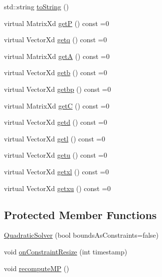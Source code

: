 {\bf }\par
\begin{DoxyCompactItemize}
\item 
std\+::string \hyperlink{classocra_1_1QuadraticSolver_a1f4efd162b95e7688d0720805fb94445}{to\+String} ()
\item 
virtual Matrix\+Xd \hyperlink{classocra_1_1QuadraticSolver_a4dcc2768227c21262571d19c0d494935}{getP} () const =0
\item 
virtual Vector\+Xd \hyperlink{classocra_1_1QuadraticSolver_a2a907a3fc7c60a7bf9e6a3403c544dcc}{getq} () const =0
\item 
virtual Matrix\+Xd \hyperlink{classocra_1_1QuadraticSolver_aa3904e85d74c7c88c3605a082741b8cd}{getA} () const =0
\item 
virtual Vector\+Xd \hyperlink{classocra_1_1QuadraticSolver_ac051c6a779ce6a6e6e6657cfd3e1f65f}{getb} () const =0
\item 
virtual Vector\+Xd \hyperlink{classocra_1_1QuadraticSolver_af5cc64ada014e8caf3d2c994eaa1c48a}{getbp} () const =0
\item 
virtual Matrix\+Xd \hyperlink{classocra_1_1QuadraticSolver_a0babcde3ffe8770131b5f842da01c49c}{getC} () const =0
\item 
virtual Vector\+Xd \hyperlink{classocra_1_1QuadraticSolver_a7f15d5d3c28feac3204542c885d68586}{getd} () const =0
\item 
virtual Vector\+Xd \hyperlink{classocra_1_1QuadraticSolver_a13e3a471615ca667daadf490dedc18eb}{getl} () const =0
\item 
virtual Vector\+Xd \hyperlink{classocra_1_1QuadraticSolver_a6d5040842f155042064a33939aa60385}{getu} () const =0
\item 
virtual Vector\+Xd \hyperlink{classocra_1_1QuadraticSolver_a9c8270a0e1a921641884586ff448392b}{getxl} () const =0
\item 
virtual Vector\+Xd \hyperlink{classocra_1_1QuadraticSolver_a58cb3039938bc2a6c9c0e1042425a98b}{getxu} () const =0
\end{DoxyCompactItemize}

\subsection*{Protected Member Functions}
\begin{DoxyCompactItemize}
\item 
\hyperlink{classocra_1_1QuadraticSolver_a1441484062835e6d3e1a86dbf8fa3eb2}{Quadratic\+Solver} (bool bounds\+As\+Constraints=false)
\item 
void \hyperlink{classocra_1_1QuadraticSolver_aea64c3c099130835a5f42051921a0b6d}{on\+Constraint\+Resize} (int timestamp)
\item 
void \hyperlink{classocra_1_1QuadraticSolver_a8494b09625e461a6fa73e2cca762abae}{recompute\+MP} ()
\end{DoxyCompactItemize}
